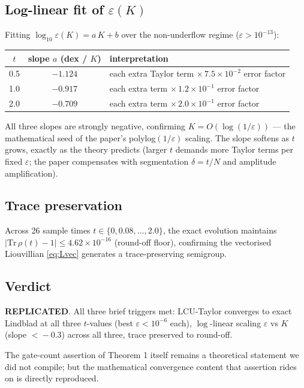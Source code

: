 \documentclass[11pt]{article}
\begin{document}
\subsection{Log-linear fit of \texorpdfstring{$\varepsilon(K)$}{eps(K)}}
Fitting $\log_{10}\varepsilon(K) = a\,K + b$ over the non-underflow regime
($\varepsilon > 10^{-13}$):
\begin{center}
\begin{tabular}{c|c|l}
\toprule
$t$ & slope $a$ (dex / $K$) & interpretation \\
\midrule
0.5 & $-1.124$ & each extra Taylor term $\times\,7.5\times10^{-2}$ error factor \\
1.0 & $-0.917$ & each extra term $\times\,1.2\times10^{-1}$ error factor \\
2.0 & $-0.709$ & each extra term $\times\,2.0\times10^{-1}$ error factor \\
\bottomrule
\end{tabular}
\end{center}
All three slopes are strongly negative, confirming
$K = O(\log(1/\varepsilon))$ — the mathematical seed of the paper's
polylog$(1/\varepsilon)$ scaling. The slope softens as $t$ grows, exactly as
the theory predicts (larger $t$ demands more Taylor terms per fixed
$\varepsilon$; the paper compensates with segmentation
$\delta=t/N$ and amplitude amplification).

\subsection{Trace preservation}
Across 26 sample times $t \in \{0, 0.08, \dots, 2.0\}$, the exact evolution
maintains $\lvert\mathrm{Tr}\,\rho(t) - 1\rvert \le 4.62\!\times\!10^{-16}$
(round-off floor), confirming the vectorised Liouvillian \eqref{eq:Lvec}
generates a trace-preserving semigroup.

\subsection{Verdict}
\textcolor{green!50!black}{\textbf{REPLICATED}}. All three brief triggers met:
LCU-Taylor converges to exact Lindblad at all three $t$-values (best $\varepsilon
\!<\!10^{-6}$ each), $\log$-linear scaling $\varepsilon$ vs $K$ (slope
$<\!-0.3$) across all three, trace preserved to round-off.

The gate-count assertion of Theorem 1 itself remains a theoretical statement
we did not compile; but the mathematical convergence content that assertion
rides on is directly reproduced.
\end{document}
